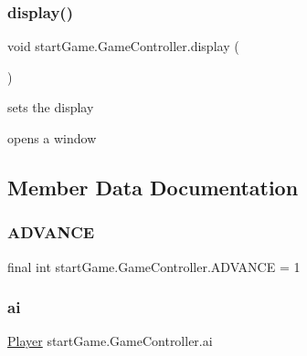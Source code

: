 \subsubsection{\texorpdfstring{display()}{display()}}
{\footnotesize\ttfamily void start\+Game.\+Game\+Controller.\+display (\begin{DoxyParamCaption}{ }\end{DoxyParamCaption})}



sets the display 

opens a window 

\subsection{Member Data Documentation}
\hypertarget{classstart_game_1_1_game_controller_a36c6fcecafa6f7176733248a5cfb2c87}{}\label{classstart_game_1_1_game_controller_a36c6fcecafa6f7176733248a5cfb2c87} 
\subsubsection{\texorpdfstring{A\+D\+V\+A\+N\+CE}{ADVANCE}}
{\footnotesize\ttfamily final int start\+Game.\+Game\+Controller.\+A\+D\+V\+A\+N\+CE = 1\hspace{0.3cm}{\ttfamily [private]}}

\hypertarget{classstart_game_1_1_game_controller_a21dfca701ec83511ac399a184530fc63}{}\label{classstart_game_1_1_game_controller_a21dfca701ec83511ac399a184530fc63} 
\subsubsection{\texorpdfstring{ai}{ai}}
{\footnotesize\ttfamily \hyperlink{classmodel_1_1_player}{Player} start\+Game.\+Game\+Controller.\+ai\hspace{0.3cm}{\ttfamily [private]}}

\hypertarget{classstart_game_1_1_game_controller_a402855c8c84c77218045cc997a784693}{}\label{classstart_game_1_1_game_controller_a402855c8c84c77218045cc997a784693} 
